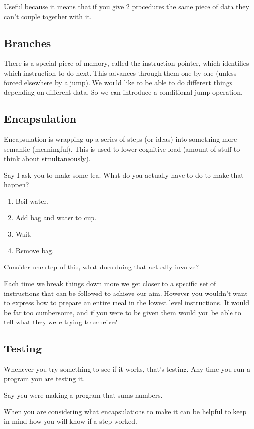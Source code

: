 \documentclass{article}
\begin{document}
Useful because it means that if you give 2 procedures the same piece of data they
can't couple together with it.

\subsection{Branches}
There is a special piece of memory, called the instruction pointer, which identifies which instruction to do next.
This advances through them one by one (unless forced elsewhere by a jump).
We would like to be able to do different things depending on different data.
So we can introduce a conditional jump operation.

\subsection{Encapsulation}
Encapsulation is wrapping up a series of steps (or ideas) into something more
semantic (meaningful). This is used to lower cognitive load (amount of stuff to
think about simultaneously).

Say I ask you to make some tea.
What do you actually have to do to make that happen?
\begin{enumerate}
\item Boil water.
\item Add bag and water to cup.
\item Wait.
\item Remove bag.
\end{enumerate}
Consider one step of this, what does doing that actually involve?

Each time we break things down more we get closer to a specific set of
instructions that can be followed to achieve our aim. However you wouldn't want
to express how to prepare an entire meal in the lowest level instructions. It
would be far too cumbersome, and if you were to be given them would you be able
to tell what they were trying to acheive?

\subsection{Testing}
Whenever you try something to see if it works, that's testing.
Any time you run a program you are testing it.

Say you were making a program that sums numbers.

When you are considering what encapsulations to make it can be helpful to keep
in mind how you will know if a step worked.
\end{document}
